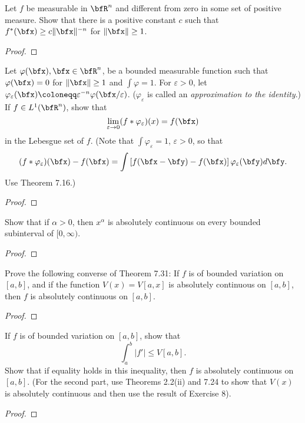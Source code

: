 
\begin{problem}
Let $f$ be measurable in $\bfR^n$ and different from zero in some set of
positive measure. Show that there is a positive constant $c$ such that
$f^*(\bfx)\geq c\|\bfx\|^{-n}$ for $\|\bfx\|\geq 1$.
\end{problem}
\begin{proof}

\end{proof}
\newpage

\begin{problem}
Let $\varphi(\bfx),\bfx\in\bfR^n$, be a bounded measurable function such
that $\varphi(\bfx)=0$ for $\|\bfx\|\geq 1$ and $\int\varphi=1$. For
$\varepsilon>0$, let
$\varphi_\varepsilon(\bfx)\coloneqq\varepsilon^{-n}\varphi(\bfx/\varepsilon)$. ($\varphi_\varepsilon$
is called an \emph{approximation to the identity}.) If $f\in L^1(\bfR^n)$,
show that
\[
\lim_{\varepsilon\to 0}(f*\varphi_\varepsilon)(x)=f(\bfx)
\]
in the Lebesgue set of $f$. (Note that $\int\varphi_\varepsilon=1$,
$\varepsilon>0$, so that
\[
(f*\varphi_\varepsilon)(\bfx)-f(\bfx)=\int\left[f(\bfx-\bfy)-f(\bfx)\right]\varphi_\varepsilon(\bfy)d\bfy.
\]
Use Theorem 7.16.)
\end{problem}
\begin{proof}
\end{proof}
\newpage

\begin{problem}
Show that if $\alpha>0$, then $x^\alpha$ is absolutely continuous on every
bounded subinterval of $[0,\infty)$.
\end{problem}
\begin{proof}
\end{proof}
\newpage


\begin{problem}
Prove the following converse of Theorem 7.31: If $f$ is of bounded
variation on $[a,b]$, and if the function $V(x)=V[a,x]$ is absolutely
continuous on $[a,b]$, then $f$ is absolutely continuous on $[a,b]$.
\end{problem}
\begin{proof}
\end{proof}
\newpage

\begin{problem}
If $f$ is of bounded variation on $[a,b]$, show that
\[
\int_a^b|f'|\leq V[a,b].
\]
Show that if equality holds in this inequality, then $f$ is absolutely
continuous on $[a,b]$. (For the second part, use Theorems 2.2(ii) and 7.24
to show that $V(x)$ is absolutely continuous and then use the result of
Exercise 8).
\end{problem}
\begin{proof}
\end{proof}
\newpage

